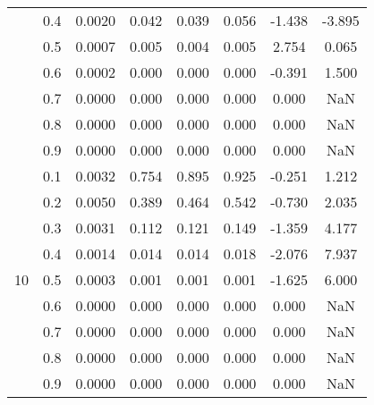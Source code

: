 \documentclass[11pt,a4paper]{report}
\begin{document}
\begin{longtable}{ | c | c || c | c | c | c | c | c | }
 & 0.4 & 0.0020 & 0.042 & 0.039 & 0.056 & -1.438 & -3.895 \\
 & 0.5 & 0.0007 & 0.005 & 0.004 & 0.005 & 2.754 & 0.065 \\
 & 0.6 & 0.0002 & 0.000 & 0.000 & 0.000 & -0.391 & 1.500 \\
 & 0.7 & 0.0000 & 0.000 & 0.000 & 0.000 & 0.000 & NaN \\
 & 0.8 & 0.0000 & 0.000 & 0.000 & 0.000 & 0.000 & NaN \\
 & 0.9 & 0.0000 & 0.000 & 0.000 & 0.000 & 0.000 & NaN \\
 \hline
\multirow{9}{*}{10} & 0.1 & 0.0032 & 0.754 & 0.895 & 0.925 & -0.251 & 1.212 \\
 & 0.2 & 0.0050 & 0.389 & 0.464 & 0.542 & -0.730 & 2.035 \\
 & 0.3 & 0.0031 & 0.112 & 0.121 & 0.149 & -1.359 & 4.177 \\
 & 0.4 & 0.0014 & 0.014 & 0.014 & 0.018 & -2.076 & 7.937 \\
 & 0.5 & 0.0003 & 0.001 & 0.001 & 0.001 & -1.625 & 6.000 \\
 & 0.6 & 0.0000 & 0.000 & 0.000 & 0.000 & 0.000 & NaN \\
 & 0.7 & 0.0000 & 0.000 & 0.000 & 0.000 & 0.000 & NaN \\
 & 0.8 & 0.0000 & 0.000 & 0.000 & 0.000 & 0.000 & NaN \\
 & 0.9 & 0.0000 & 0.000 & 0.000 & 0.000 & 0.000 & NaN \\
 \hline
\hline
\end{longtable}
\end{document}
